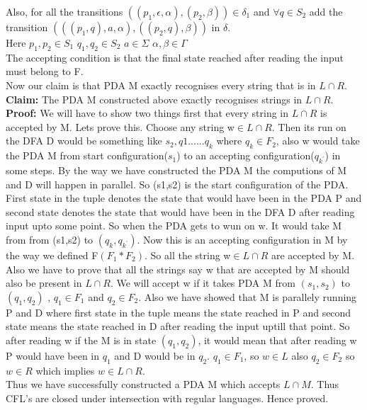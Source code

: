 \documentclass{article}
\begin{document}
Also, for all the transitions $((p_1,\epsilon,\alpha),(p_2,\beta)) \in \delta_1$  and $\forall q \in S_2$ add the transition $(((p_1,q),a,\alpha),((p_2,q),\beta))$ in $\delta$.\\
Here $p_1,p_2 \in S_1$  $q_1,q_2 \in S_2$  $a \in \Sigma$  $\alpha , \beta \in \Gamma$\\
The accepting condition is that the final state reached after reading the input must belong to F.\\
Now our claim is that PDA M exactly recognises every string that is in $L\cap R$. \\
\textbf{Claim:} The PDA M constructed above exactly recognises strings in $L\cap R$. \\
\textbf{Proof:} We will have to show two things first that every string in $L\cap R$ is accepted by M. Lets prove this. Choose any string w$\in L\cap R$. Then its run on the DFA D would be something like $s_2,q1......q_k$ where $q_k \in F_2$, also w would take the PDA M from start configuration($s_1$) to an accepting configuration($q_{k^{'}}$) in some steps. By the way we have constructed the PDA M the computions of M and D will happen in parallel. So (s1,s2) is the start configuration of the PDA. First state in the tuple denotes the state that would have been in the PDA P and second state denotes the state that would have been in the DFA D after reading input upto some point. So when the PDA gets to wun on w. It would take M from from (s1,s2) to $(q_k,q_{k^{'}})$. Now this is an accepting configuration in M by the way we defined F$(F_1 * F_2)$. So all the string  w$\in L\cap R$ are accepted by M.\\
Also we have to prove that all the strings say w that are accepted by M should also be present in $ L\cap R$. We will accept w if it takes PDA M from $(s_1,s_2)$ to $(q_1,q_2)$ , $q_1 \in F_1$ and $q_2 \in F_2$. Also we have showed that M is parallely running P and D where first state in the tuple means the state reached in P and second state means the state reached in D after reading the input uptill that point. So after reading  w if the M is in state $(q_1,q_2)$, it would mean that after reading w P would have been in $q_1$ and D would be in $q_2$. $q_1 \in F_1$, so $w \in L$ also $q_2 \in F_2$ so $w \in R$ which implies $w \in L \cap R$.\\
\newline
Thus we have successfully constructed a PDA M which accepts $L \cap M$. Thus CFL's are closed under intersection with regular languages. Hence proved. \\
\pagebreak
\end{document}
